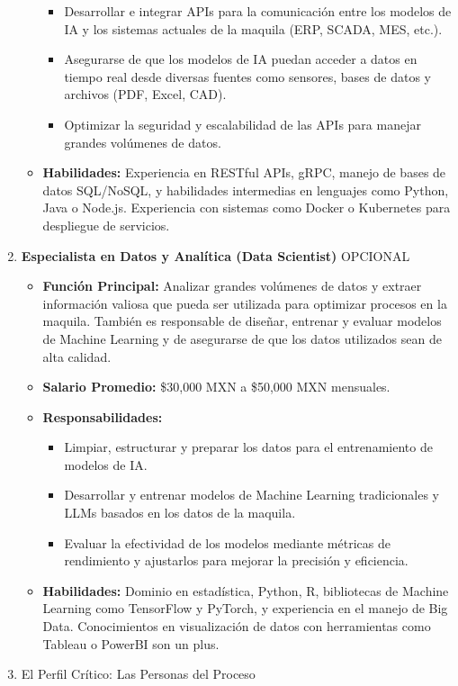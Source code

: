 \documentclass[
  10pt,
  letterpaper,
]{book}
\providecommand{\tightlist}{%
  \setlength{\itemsep}{0pt}\setlength{\parskip}{0pt}}\usepackage{longtable,booktabs,array}
\begin{document}
\begin{enumerate}
\begin{itemize}
    \begin{itemize}
    \tightlist
    \item
      Desarrollar e integrar APIs para la comunicación entre los modelos
      de IA y los sistemas actuales de la maquila (ERP, SCADA, MES,
      etc.).
    \item
      Asegurarse de que los modelos de IA puedan acceder a datos en
      tiempo real desde diversas fuentes como sensores, bases de datos y
      archivos (PDF, Excel, CAD).
    \item
      Optimizar la seguridad y escalabilidad de las APIs para manejar
      grandes volúmenes de datos.
    \end{itemize}
  \item
    \textbf{Habilidades:} Experiencia en RESTful APIs, gRPC, manejo de
    bases de datos SQL/NoSQL, y habilidades intermedias en lenguajes
    como Python, Java o Node.js. Experiencia con sistemas como Docker o
    Kubernetes para despliegue de servicios.
  \end{itemize}
\item
  \textbf{Especialista en Datos y Analítica (Data Scientist)} OPCIONAL

  \begin{itemize}
  \tightlist
  \item
    \textbf{Función Principal:} Analizar grandes volúmenes de datos y
    extraer información valiosa que pueda ser utilizada para optimizar
    procesos en la maquila. También es responsable de diseñar, entrenar
    y evaluar modelos de Machine Learning y de asegurarse de que los
    datos utilizados sean de alta calidad.
  \item
    \textbf{Salario Promedio:} \$30,000 MXN a \$50,000 MXN mensuales.
  \item
    \textbf{Responsabilidades:}

    \begin{itemize}
    \tightlist
    \item
      Limpiar, estructurar y preparar los datos para el entrenamiento de
      modelos de IA.
    \item
      Desarrollar y entrenar modelos de Machine Learning tradicionales y
      LLMs basados en los datos de la maquila.
    \item
      Evaluar la efectividad de los modelos mediante métricas de
      rendimiento y ajustarlos para mejorar la precisión y eficiencia.
    \end{itemize}
  \item
    \textbf{Habilidades:} Dominio en estadística, Python, R, bibliotecas
    de Machine Learning como TensorFlow y PyTorch, y experiencia en el
    manejo de Big Data. Conocimientos en visualización de datos con
    herramientas como Tableau o PowerBI son un plus.
  \end{itemize}
\item
  El Perfil Crítico: Las Personas del Proceso
\end{enumerate}
\end{document}
